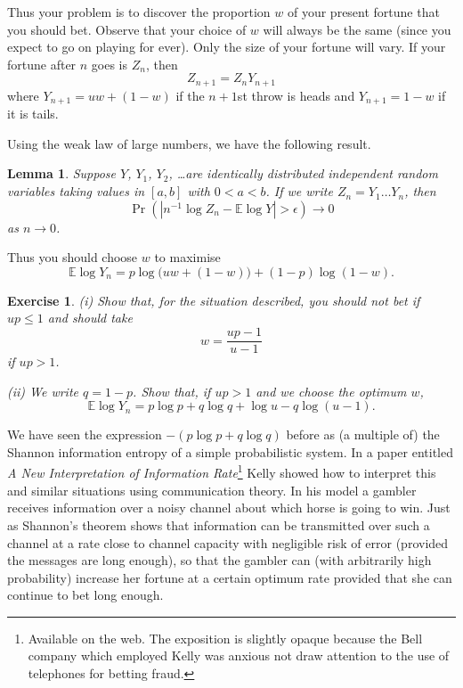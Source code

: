 \documentclass[12pt,a4paper]{article}
\theoremstyle{plain}
\newtheorem{lemma}[theorem]{Lemma}
\newtheorem{exercise}[theorem]{Exercise}
\theoremstyle{definition}
\begin{document}
    Thus your problem is to discover
    the proportion $w$ of your present fortune
    that you should bet. Observe that your choice of $w$
    will always be the same (since
    you expect to go on playing for ever). Only the size of your
    fortune will vary. If your fortune after $n$ goes
    is $Z_{n}$, then
    \[Z_{n+1}=Z_{n}Y_{n+1}\]
    where $Y_{n+1}=uw+(1-w)$ if the $n+1$st throw is heads
    and $Y_{n+1}=1-w$ if it is tails.

    Using the weak law of large numbers, we have the following
    result.
    \begin{lemma}
        Suppose $Y$, $Y_{1}$, $Y_{2}$, \dots are identically
        distributed
        independent random variables taking values in $[a,b]$ with
        $0<a<b$. If we write $Z_{n}=Y_{1}\dots Y_{n}$, then
        \[\Pr(|n^{-1}\log Z_{n}-{\mathbb E}\log Y|>\epsilon)\rightarrow 0\]
        as $n\rightarrow 0$.
    \end{lemma}

    Thus you should choose $w$ to maximise
    \[{\mathbb E}\log Y_{n}=p\log\big(uw+(1-w)\big)+(1-p)\log(1-w).\]
    \begin{exercise}
        \label{E;fast Kelly}
        (i) Show that, for the situation described,
        you should not bet if $up\leq 1$ and should take
        \[w=\frac{up-1}{u-1}\]
        if $up>1$.

        (ii) We write $q=1-p$. Show that, if $up>1$ and we choose
        the optimum $w$,
        \[{\mathbb E}\log Y_{n}=p\log p+q\log q+\log u-q\log(u-1).\]
    \end{exercise}

    We have seen the expression $-(p\log p+q\log q)$ before
    as (a multiple of)
    the Shannon information entropy of a simple probabilistic system.
    In a paper entitled
    \emph{A New Interpretation of Information Rate}\footnote{Available
    on the web. The exposition is slightly opaque because
    the Bell company which employed Kelly was anxious
    not draw attention to the use of telephones for
    betting fraud.}
    Kelly showed how to interpret this and similar
    situations using communication theory. In his model
    a gambler receives information over a noisy channel
    about which horse is going to win. Just as Shannon's theorem
    shows that information can be transmitted over
    such a channel at a rate close to channel capacity
    with negligible risk of error (provided the
    messages are long enough), so that the gambler can
    (with arbitrarily high probability)
    increase her fortune at a certain optimum rate
    provided that she can continue to bet long enough.
\end{document}
